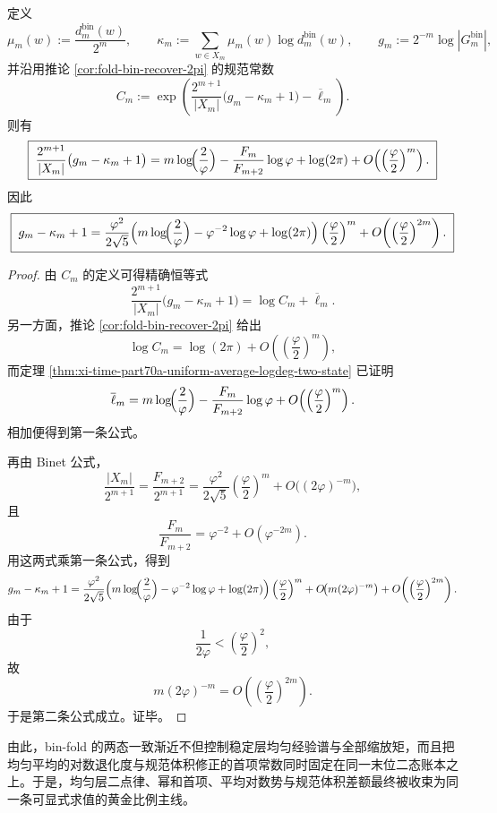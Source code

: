 \begin{theorem}[规范体积与纤维信息差的一阶首项]\label{thm:xi-time-part70a-gauge-fiber-gap-first-order}
定义
\[
\mu_m(w):=\frac{d_m^{\mathrm{bin}}(w)}{2^m},
\qquad
\kappa_m:=\sum_{w\in X_m}\mu_m(w)\log d_m^{\mathrm{bin}}(w),
\qquad
g_m:=2^{-m}\log|G_m^{\mathrm{bin}}|,
\]
并沿用推论 \ref{cor:fold-bin-recover-2pi} 的规范常数
\[
C_m
:=
\exp\!\left(
\frac{2^{m+1}}{|X_m|}\bigl(g_m-\kappa_m+1\bigr)-\overline{\ell}_m
\right).
\]
则有
\[
\boxed{\;
\frac{2^{m+1}}{|X_m|}\bigl(g_m-\kappa_m+1\bigr)
=
m\log\!\Bigl(\frac{2}{\varphi}\Bigr)
-\frac{F_m}{F_{m+2}}\log\varphi
+\log(2\pi)
+O\!\left(\left(\frac{\varphi}{2}\right)^m\right).\;}
\]
因此
\[
\boxed{\;
g_m-\kappa_m+1
=
\frac{\varphi^2}{2\sqrt5}
\Bigl(
m\log\!\Bigl(\frac{2}{\varphi}\Bigr)
-\varphi^{-2}\log\varphi
+\log(2\pi)
\Bigr)
\left(\frac{\varphi}{2}\right)^m
+O\!\left(\left(\frac{\varphi}{2}\right)^{2m}\right).\;}
\]
\end{theorem}
\begin{proof}
由 \(C_m\) 的定义可得精确恒等式
\[
\frac{2^{m+1}}{|X_m|}\bigl(g_m-\kappa_m+1\bigr)=\log C_m+\overline{\ell}_m.
\]
另一方面，推论 \ref{cor:fold-bin-recover-2pi} 给出
\[
\log C_m=\log(2\pi)+O\!\left(\left(\frac{\varphi}{2}\right)^m\right),
\]
而定理 \ref{thm:xi-time-part70a-uniform-average-logdeg-two-state} 已证明
\[
\overline{\ell}_m
=
m\log\!\Bigl(\frac{2}{\varphi}\Bigr)
-\frac{F_m}{F_{m+2}}\log\varphi
+O\!\left(\left(\frac{\varphi}{2}\right)^m\right).
\]
相加便得到第一条公式。

再由 Binet 公式，
\[
\frac{|X_m|}{2^{m+1}}
=
\frac{F_{m+2}}{2^{m+1}}
=
\frac{\varphi^2}{2\sqrt5}\left(\frac{\varphi}{2}\right)^m
+O\!\bigl((2\varphi)^{-m}\bigr),
\]
且
\[
\frac{F_m}{F_{m+2}}=\varphi^{-2}+O(\varphi^{-2m}).
\]
用这两式乘第一条公式，得到
\[
g_m-\kappa_m+1
=
\frac{\varphi^2}{2\sqrt5}
\Bigl(
m\log\!\Bigl(\frac{2}{\varphi}\Bigr)
-\varphi^{-2}\log\varphi
+\log(2\pi)
\Bigr)
\left(\frac{\varphi}{2}\right)^m
+O\!\bigl(m(2\varphi)^{-m}\bigr)
+O\!\left(\left(\frac{\varphi}{2}\right)^{2m}\right).
\]
由于
\[
\frac{1}{2\varphi}<\left(\frac{\varphi}{2}\right)^2,
\]
故
\[
m(2\varphi)^{-m}=O\!\left(\left(\frac{\varphi}{2}\right)^{2m}\right).
\]
于是第二条公式成立。证毕。
\end{proof}

\noindent
由此，bin-fold 的两态一致渐近不但控制稳定层均匀经验谱与全部缩放矩，而且把均匀平均的对数退化度与规范体积修正的首项常数同时固定在同一末位二态账本之上。于是，均匀层二点律、幂和首项、平均对数势与规范体积差额最终被收束为同一条可显式求值的黄金比例主线。

\endinput
